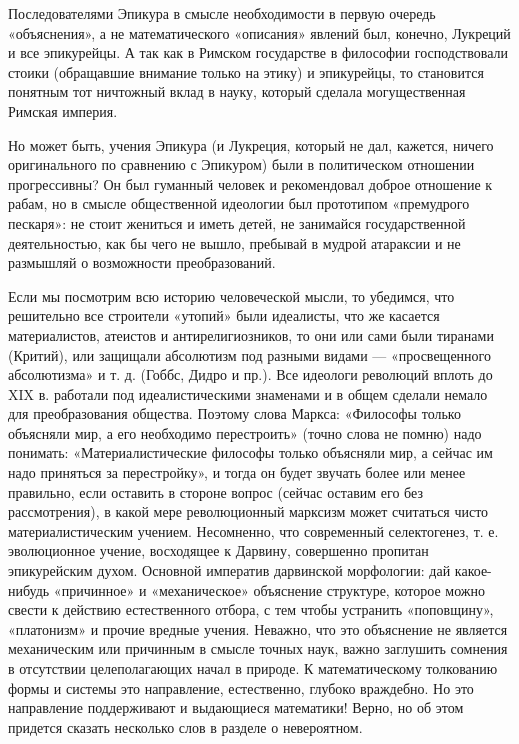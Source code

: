 Последователями  Эпикура  в  смысле  необходимости  в  первую  очередь
«объяснения», а  не математического  «описания» явлений  был, конечно,
Лукреций  и  все  эпикурейцы.  А  так  как  в  Римском  государстве  в
философии господствовали стоики (обращавшие  внимание только на этику)
и  эпикурейцы, то  становится понятным  тот ничтожный  вклад в  науку,
который сделала могущественная Римская империя.

Но может  быть, учения Эпикура  (и Лукреция, который не  дал, кажется,
ничего  оригинального по  сравнению  с Эпикуром)  были в  политическом
отношении прогрессивны? Он был  гуманный человек и рекомендовал доброе
отношение к рабам,  но в смысле общественной  идеологии был прототипом
«премудрого пескаря»:  не стоит жениться  и иметь детей,  не занимайся
государственной деятельностью, как бы чего не вышло, пребывай в мудрой
атараксии и не размышляй о возможности преобразований.

Если мы  посмотрим всю  историю человеческой  мысли, то  убедимся, что
решительно  все строители  «утопий»  были идеалисты,  что же  касается
материалистов,  атеистов и  антирелигиозников,  то они  или сами  были
тиранами  (Критий), или  защищали  абсолютизм под  разными видами  ---
«просвещенного абсолютизма» и т. д. (Гоббс, Дидро и пр.). Все идеологи
революций вплоть до XIX в. работали под идеалистическими знаменами и в
общем  сделали  немало  для  преобразования  общества.  Поэтому  слова
Маркса: «Философы только объясняли  мир, а его необходимо перестроить»
(точно  слова не  помню) надо  понимать: «Материалистические  философы
только объясняли  мир, а сейчас  им надо приняться за  перестройку», и
тогда  он  будет звучать  более  или  менее правильно,  если  оставить
в  стороне  вопрос (сейчас  оставим  его  без рассмотрения),  в  какой
мере революционный  марксизм может считаться  чисто материалистическим
учением. Несомненно, что современный  селектогенез, т. е. эволюционное
учение,  восходящее   к  Дарвину,  совершенно   пропитан  эпикурейским
духом.  Основной  императив  дарвинской морфологии:  дай  какое-нибудь
«причинное»  и  «механическое»  объяснение  структуре,  которое  можно
свести  к  действию  естественного   отбора,  с  тем  чтобы  устранить
«поповщину»,  «платонизм» и  прочие вредные  учения. Неважно,  что это
объяснение  не является  механическим  или причинным  в смысле  точных
наук,  важно заглушить  сомнения в  отсутствии целеполагающих  начал в
природе. К математическому толкованию формы и системы это направление,
естественно,  глубоко враждебно.  Но  это  направление поддерживают  и
выдающиеся математики!  Верно, но  об этом придется  сказать несколько
слов в разделе о невероятном.

